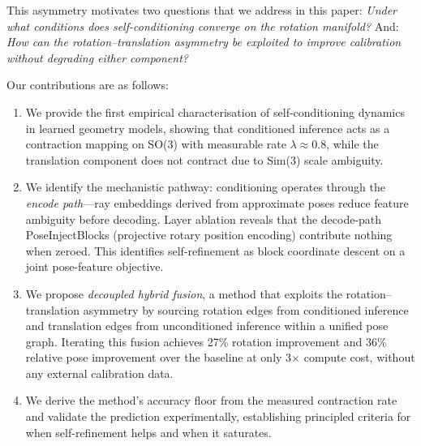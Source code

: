 This asymmetry motivates two questions that we address in this paper: \emph{Under what conditions does self-conditioning converge on the rotation manifold?} And: \emph{How can the rotation--translation asymmetry be exploited to improve calibration without degrading either component?}

Our contributions are as follows:
\begin{enumerate}
    \item We provide the first empirical characterisation of self-conditioning dynamics in learned geometry models, showing that conditioned inference acts as a contraction mapping on SO(3) with measurable rate $\lambda \approx 0.8$, while the translation component does not contract due to Sim(3) scale ambiguity.

    \item We identify the mechanistic pathway: conditioning operates through the \emph{encode path}---ray embeddings derived from approximate poses reduce feature ambiguity before decoding. Layer ablation reveals that the decode-path PoseInjectBlocks (projective rotary position encoding) contribute nothing when zeroed. This identifies self-refinement as block coordinate descent on a joint pose-feature objective.

    \item We propose \emph{decoupled hybrid fusion}, a method that exploits the rotation--translation asymmetry by sourcing rotation edges from conditioned inference and translation edges from unconditioned inference within a unified pose graph. Iterating this fusion achieves 27\% rotation improvement and 36\% relative pose improvement over the baseline at only 3$\times$ compute cost, without any external calibration data.

    \item We derive the method's accuracy floor from the measured contraction rate and validate the prediction experimentally, establishing principled criteria for when self-refinement helps and when it saturates.
\end{enumerate}
